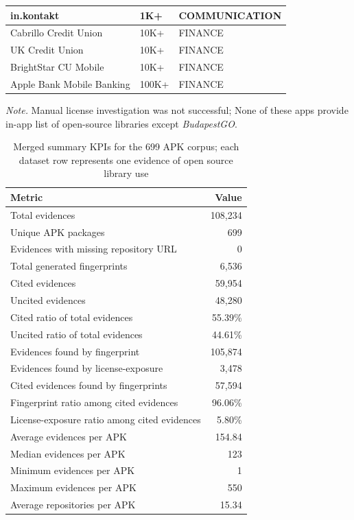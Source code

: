 \documentclass[12pt,a4paper]{report}
\begin{document}
\begin{table}[!ht]
\begin{tabular}{|l|l|l|}
        in.kontakt & 1K+ & COMMUNICATION \\ \hline
        Cabrillo Credit Union & 10K+ & FINANCE \\ \hline
        UK Credit Union & 10K+ & FINANCE \\ \hline
        BrightStar CU Mobile & 10K+ & FINANCE \\ \hline
        Apple Bank Mobile Banking & 100K+ & FINANCE \\ \hline
    \end{tabular}
    {\footnotesize\textit{Note.} Manual license investigation was not successful; None of these apps provide in-app list of open-source libraries except \textit{BudapestGO}.}
\end{table}


\begin{table}[htbp]
\centering
\caption[Merged summary KPIs for the 699 APK corpus]{Merged summary KPIs for the 699 APK corpus; each dataset row represents one evidence of open source library use}
\label{tab:summary-kpis-final-corpus}
\begin{tabular}{lr}
\hline
\textbf{Metric} & \textbf{Value} \\
\hline
Total evidences & 108,234 \\
Unique APK packages & 699 \\
Evidences with missing repository URL & 0 \\
Total generated fingerprints & 6,536 \\
Cited evidences & 59,954 \\
Uncited evidences & 48,280 \\
Cited ratio of total evidences & 55.39\% \\
Uncited ratio of total evidences & 44.61\% \\
Evidences found by fingerprint & 105,874 \\
Evidences found by license-exposure & 3,478 \\
Cited evidences found by fingerprints & 57,594 \\
Fingerprint ratio among cited evidences & 96.06\% \\
License-exposure ratio among cited evidences & 5.80\% \\
Average evidences per APK & 154.84 \\
Median evidences per APK & 123 \\
Minimum evidences per APK & 1 \\
Maximum evidences per APK & 550 \\
Average repositories per APK & 15.34 \\

\end{tabular}
\end{table}
\end{document}
